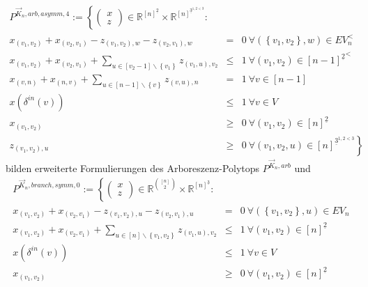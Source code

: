 \documentclass[10p,a4paper,BCOR = 12mm, DIV=15]{scrbook}
\begin{document}
{\begin{Kor}
\begin{eqnarray*}
P^{\vec{K}_n, arb, asymm, 4} := \left\{
\left(\begin{array}{c}
x \\
z
\end{array}\right)\in \mathbb{R}^{[n]^{\underline{2}}} \times \mathbb{R}^{\left[n\right]^{\underline{3}^{1, 2<3}}}: \nonumber\right. & & \\
x_{\left(v_1, v_2\right)} + x_{\left(v_2, v_1\right)} - z_{\left(v_1, v_2\right), w} - z_{\left(v_2, v_1\right), w} & = & 0\ \forall \left(\left\{v_1, v_2\right\}, w\right)\in EV_n^< \\
x_{\left(v_1, v_2\right)} + x_{\left(v_2, v_1\right)} + \sum_{u\in[v_2-1]\backslash\left\{v_1\right\}} z_{\left(v_1, u\right), v_2} & \leq & 1\ \forall \left(v_1, v_2\right)\in {[n-1]^{\underline{2}}}^<  \\
x_{\left(v, n\right)} + x_{\left(n, v\right)} + \sum_{u\in[n-1]\backslash\left\{v\right\}} z_{\left(v, u\right), n} & = & 1\ \forall v \in [n-1] \\
x\left(\delta^{in}\left(v\right)\right) & \leq & 1 \ \forall v \in V \\
x_{\left(v_1, v_2\right)} & \geq & 0 \ \forall \left(v_1, v_2\right) \in \left[n\right]^{\underline{2}} \nonumber \\
z_{\left(v_1, v_2\right), u} & \geq & 0\nonumber \left. \ \forall \left(v_1, v_2, u\right) \in \left[n\right]^{\underline{3}^{1, 2 < 3}}\right\}
\end{eqnarray*}
bilden erweiterte Formulierungen des Arboreszenz-Polytops $P^{\vec{K}_n, arb}$ und
\begin{eqnarray*}
P^{\vec{K}_n, branch, symm, 0} := \left\{\left(\begin{array}{c}
x \\
z
\end{array}\right)\in\mathbb{R}^{[n]\choose 2}\times \mathbb{R}^{[n]^{\underline{3}}}: \right. \nonumber \\
x_{\left(v_1, v_2\right)} + x_{\left(v_2, v_1\right)} - z_{\left(v_1, v_2\right), u} - z_{\left(v_2, v_1\right), u} & = & 0\ \forall \left(\left\{v_1, v_2\right\}, u\right)\in EV_n \\
x_{\left(v_1, v_2\right)} + x_{\left(v_2, v_1\right)} + \sum_{u\in[n]\backslash\left\{v_1, v_2\right\}} z_{\left(v_1, u\right), v_2} & \leq & 1\ \forall \left(v_1, v_2\right)\in [n]^{\underline{2}} \\
x\left(\delta^{in}\left(v\right)\right) & \leq & 1 \ \forall v \in V \\
x_{\left(v_1, v_2\right)} & \geq & 0 \ \forall \left(v_1, v_2\right) \in \left[n\right]^{\underline{2}} \nonumber \\

\end{eqnarray*}
\end{Kor}}
\end{document}
